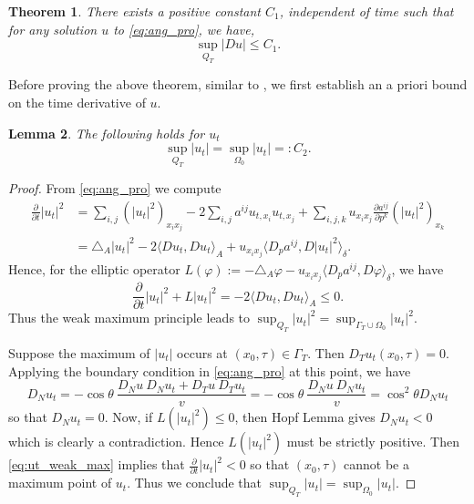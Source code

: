 \documentclass[12pt]{article}
\numberwithin{equation}{section}
\theoremstyle{plain}
\newtheorem{theorem}{Theorem}[section]
\newtheorem{lemma}[theorem]{Lemma}
\theoremstyle{definition}
\theoremstyle{remark}
\begin{document}
\begin{theorem}\label{thm:ang_grad_est}
There exists a positive constant $C_1$, independent of time such that for any solution $u$ to \eqref{eq:ang_pro}, we have,
\begin{equation}\label{eq:ang_grad_est}
    \sup_{Q_T} |Du| \leq C_1.
\end{equation}
\end{theorem}
Before proving the above theorem, similar to \cite{AW2},
we first establish an a priori bound on the time derivative of $u$.
\begin{lemma}\label{lem:ang_ut_est}
The following holds for $u_t$ 
\begin{equation*}
    \sup_{Q_T} |u_t| = \sup_{\Omega_0}|u_t| =: C_2.
\end{equation*}
\end{lemma} 
\begin{proof}
From \eqref{eq:ang_pro} we compute 
\begin{equation} \label{eq:ut_deri}
\begin{split}
    \frac{\partial}{\partial t} |u_t|^2 & = \sum_{i,j} (|u_t|^2)_{x_i x_j} - 2\sum_{i,j} a^{ij} u_{t,x_i} u_{t,x_j} + \sum_{i,j,k} u_{x_i x_j} \frac{\partial a^{ij}}{\partial p^k} (|u_t|^2)_{x_k} \\
    & = \triangle_A |u_t|^2 - 2 \langle Du_t,Du_t  \rangle_A + u_{x_i x_j} \langle D_p a^{ij},D|u_t|^2 \rangle_{\delta}.
\end{split}
\end{equation}
Hence, for the elliptic operator $L(\varphi) := - \triangle_A \varphi - u_{x_i x_j} \langle D_p a^{ij},D\varphi \rangle_{\delta}$, 
we have 
\begin{equation}\label{eq:ut_weak_max}
\frac{\partial}{\partial t} |u_t|^2 + L |u_t|^2 = -2 \langle Du_t,Du_t  \rangle_A \leq 0.
\end{equation}
Thus the weak maximum principle leads to 
$\sup_{Q_T} |u_t|^2=\sup_{\Gamma_T \cup \Omega_0} |u_t|^2 $.

Suppose the maximum of $|u_t|$ occurs at $(x_0,\tau)\in\Gamma_T$. 
Then $D_T u_t(x_0,\tau)=0$. Applying the boundary condition in \eqref{eq:ang_pro} at this point, we have
\begin{equation*}
    D_N u_t = -\cos{\theta} \ \frac{D_N u \ D_N u_t + D_T u \ D_T u_t}{v} = -\cos{\theta} \ \frac{D_N u \ D_N u_t }{v} = \cos^2{\theta} D_N u_t
\end{equation*}
so that $D_N u_t=0$. Now, if $L (|u_t|^2)\leq 0$, then Hopf Lemma gives $D_N u_t<0$ 
which is clearly a contradiction. Hence $L(|u_t|^2)$ must be strictly
positive. Then \eqref{eq:ut_weak_max} implies that
$\frac{\partial}{\partial t} |u_t|^2 < 0$ so that $(x_0, \tau)$ cannot be a
maximum point of $u_t$. Thus we conclude that
$\sup_{Q_T} |u_t| = \sup_{\Omega_0}|u_t|$.
\end{proof}   
\end{document}

